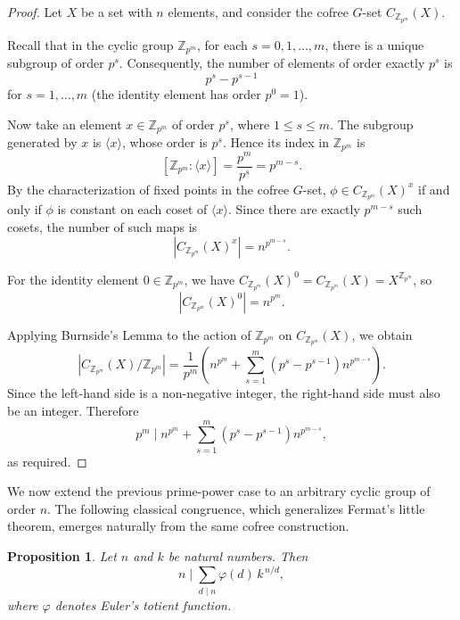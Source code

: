 \documentclass{amsart}
\newtheorem{proposition}{Proposition}
\begin{document}
\begin{proof}
Let $X$ be a set with $n$ elements, and consider the cofree $G$-set $C_{\mathbb{Z}_{p^m}}(X)$.

Recall that in the cyclic group $\mathbb{Z}_{p^m}$, for each $s = 0, 1, \dots, m$, there is a unique subgroup of order $p^s$. Consequently, the number of elements of order exactly $p^s$ is
\[
p^s - p^{s-1}
\]
for $s = 1, \dots, m$ (the identity element has order $p^0 = 1$).

Now take an element $x \in \mathbb{Z}_{p^m}$ of order $p^s$, where $1 \le s \le m$. The subgroup generated by $x$ is $\langle x \rangle$, whose order is $p^s$. Hence its index in $\mathbb{Z}_{p^m}$ is
\[
[\mathbb{Z}_{p^m} : \langle x \rangle] = \frac{p^m}{p^s} = p^{m-s}.
\]
By the characterization of fixed points in the cofree $G$-set, $\phi \in C_{\mathbb{Z}_{p^m}}(X)^x$ if and only if $\phi$ is constant on each coset of $\langle x \rangle$. Since there are exactly $p^{m-s}$ such cosets, the number of such maps is
\[
\left\lvert C_{\mathbb{Z}_{p^m}}(X)^x \right\rvert = n^{p^{m-s}}.
\]

For the identity element $0 \in \mathbb{Z}_{p^m}$, we have $C_{\mathbb{Z}_{p^m}}(X)^0 = C_{\mathbb{Z}_{p^m}}(X) = X^{\mathbb{Z}_{p^m}}$, so
\[
\left\lvert C_{\mathbb{Z}_{p^m}}(X)^0 \right\rvert = n^{p^m}.
\]

Applying Burnside's Lemma to the action of $\mathbb{Z}_{p^m}$ on $C_{\mathbb{Z}_{p^m}}(X)$, we obtain
\[
\left\lvert C_{\mathbb{Z}_{p^m}}(X)/\mathbb{Z}_{p^m} \right\rvert
= \frac{1}{p^m} \left( n^{p^m} + \sum_{s=1}^m (p^s - p^{s-1}) n^{p^{m-s}} \right).
\]
Since the left-hand side is a non-negative integer, the right-hand side must also be an integer. Therefore
\[
p^m \mid n^{p^m} + \sum_{s=1}^m (p^s - p^{s-1}) n^{p^{m-s}},
\]
as required.
\end{proof}

We now extend the previous prime-power case to an arbitrary cyclic group of order $n$. The following classical congruence, which generalizes Fermat's little theorem, emerges naturally from the same cofree construction.

\begin{proposition}\label{prop:fermat_general}
Let $n$ and $k$ be natural numbers. Then
\[
n \mid \sum_{d \mid n} \varphi(d)\, k^{\,n/d},
\]
where $\varphi$ denotes Euler's totient function.
\end{proposition}
\end{document}
